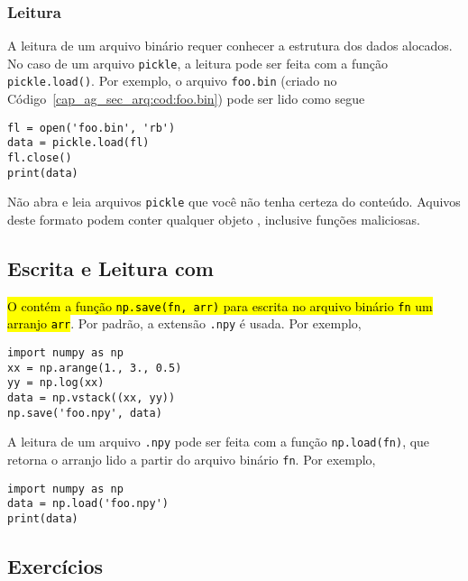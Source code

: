 \subsubsection{Leitura}

A leitura de um arquivo binário requer conhecer a estrutura dos dados alocados. No caso de um arquivo \lstinline+pickle+, a leitura pode ser feita com a função \lstinline+pickle.load()+. Por exemplo, o arquivo \lstinline+foo.bin+ (criado no Código~\ref{cap_ag_sec_arq:cod:foo.bin}) pode ser lido como segue
\begin{lstlisting}
fl = open('foo.bin', 'rb')
data = pickle.load(fl)
fl.close()
print(data)
\end{lstlisting}

\begin{obs}
  Não abra e leia arquivos \lstinline+pickle+ que você não tenha certeza do conteúdo. Aquivos deste formato podem conter qualquer objeto {\python}, inclusive funções maliciosas.
\end{obs}

\subsection{Escrita e Leitura com {\numpy}}

\hl{O {\numpy} contém a função {\lstinline+np.save(fn, arr)+} para escrita no arquivo binário {\lstinline+fn+} um arranjo {\lstinline+arr+}}. Por padrão, a extensão \lstinline+.npy+ é usada. Por exemplo,
\begin{lstlisting}
import numpy as np
xx = np.arange(1., 3., 0.5)
yy = np.log(xx)
data = np.vstack((xx, yy))
np.save('foo.npy', data)
\end{lstlisting}

A leitura de um arquivo \lstinline+.npy+ pode ser feita com a função \lstinline+np.load(fn)+, que retorna o arranjo lido a partir do arquivo binário \lstinline+fn+. Por exemplo,
\begin{lstlisting}
import numpy as np
data = np.load('foo.npy')
print(data)
\end{lstlisting}

\subsection{Exercícios}

